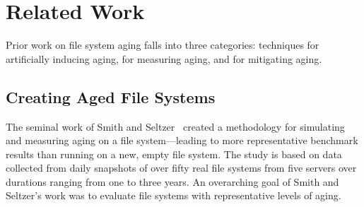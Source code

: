 \section{Related Work}\label{sec:fsa-related}
Prior work on file system aging falls into three categories:
techniques for artificially inducing aging, for
measuring aging, and for mitigating aging.




\subsection{Creating Aged File Systems}

The seminal work of Smith and Seltzer~\cite{SmithSe97} created a
methodology for 
simulating and measuring aging on a file system---leading
to more representative benchmark results than 
running on a new, empty file system.
The study is based on data  collected
from daily snapshots of over fifty real file systems from five servers
over durations ranging from one to three years. 
An overarching goal of Smith and Seltzer's work was to evaluate
file systems with representative levels of aging.

